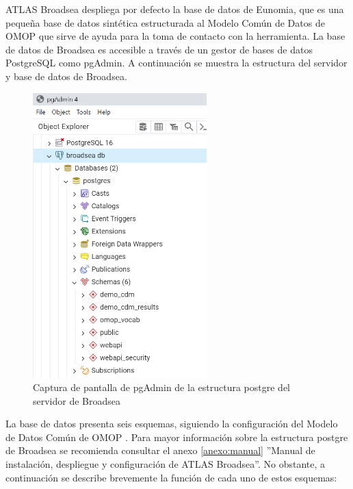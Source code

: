 ATLAS Broadsea despliega por defecto la base de datos de Eunomia, que es una pequeña base de datos sintética estructurada al Modelo Común de Datos de OMOP que sirve de ayuda para la toma de contacto con la herramienta. La base de datos de Broadsea es accesible a través de un gestor de bases de datos PostgreSQL como pgAdmin. A continuación se muestra la estructura del servidor y base de datos de Broadsea.

\begin{figure}[H]
\centering
\includegraphics[width=0.60\textwidth]{figures/serverBroadsea.png}
     \caption{Captura de pantalla de pgAdmin de la estructura postgre del servidor de Broadsea}
    \label{fig:serverBroadsea}
\end{figure}

La base de datos presenta seis esquemas, siguiendo la configuración del Modelo de Datos Común de OMOP \cite{githubCDMConfig}. Para mayor información sobre la estructura postgre de Broadsea se recomienda consultar el anexo \ref{anexo:manual} ''Manual de instalación, despliegue y configuración de ATLAS Broadsea''. No obstante, a continuación se describe brevemente la función de cada uno de estos esquemas:

